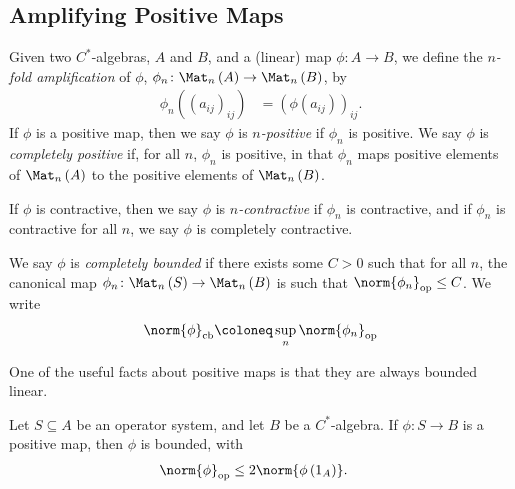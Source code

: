 \subsection{Amplifying Positive Maps}%
\begin{definition}
  Given two $C^{\ast}$-algebras, $A$ and $B$, and a (linear) map $\phi\colon A\rightarrow B$, we define the \textit{$n$-fold amplification} of $\phi$, $\phi_n\colon \Mat_n\left( A \right)\rightarrow \Mat_n\left( B \right)$, by
  \begin{align*}
    \phi_n\left( \left( a_{ij} \right)_{ij} \right) &= \left( \phi\left( a_{ij} \right) \right)_{ij}.
  \end{align*}
  If $\phi$ is a positive map, then we say $\phi$ is \textit{$n$-positive} if $\phi_n$ is positive. We say $\phi$ is \textit{completely positive} if, for all $n$, $\phi_n$ is positive, in that $\phi_n$ maps positive elements of $\Mat_n\left( A \right)$ to the positive elements of $\Mat_n\left( B \right)$.\newline

  If $\phi$ is contractive, then we say $\phi$ is \textit{$n$-contractive} if $\phi_n$ is contractive, and if $\phi_n$ is contractive for all $n$, we say $\phi$ is completely contractive.\newline

  We say $\phi$ is \textit{completely bounded} if there exists some $C > 0$ such that for all $n$, the canonical map $\phi_n\colon \Mat_n\left( S \right)\rightarrow \Mat_n\left( B \right)$ is such that $\norm{\phi_n}_{\op}\leq C$. We write
  \begin{align*}
    \norm{\phi}_{\cb}\coloneq \sup_{n} \norm{\phi_n}_{\op}
  \end{align*}
\end{definition}
One of the useful facts about positive maps is that they are always bounded linear.
\begin{proposition}
  Let $S\subseteq A$ be an operator system, and let $B$ be a $C^{\ast}$-algebra. If $\phi\colon S\rightarrow B$ is a positive map, then $\phi$ is bounded, with
  \begin{align*}
    \norm{\phi}_{\op} &\leq 2\norm{\phi\left( 1_A \right)}.
  \end{align*}
\end{proposition}
